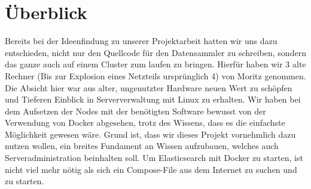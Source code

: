 \documentclass[12pt,oneside,a4paper,parskip]{scrbook}
\begin{document}
\section{Überblick} Bereits bei der Ideenfindung zu unserer Projektarbeit hatten wir uns dazu entschieden, nicht nur den Quellcode für den Datensammler zu schreiben, sondern das ganze auch auf einem Cluster zum laufen zu bringen. Hierfür haben wir 3 alte Rechner (Bis zur Explosion eines Netzteils ursprünglich 4) von Moritz genommen. Die Absicht hier war aus alter, ungenutzter Hardware neuen Wert zu schöpfen und Tieferen Einblick in Serververwaltung mit Linux zu erhalten. Wir haben bei dem Aufsetzen der Nodes mit der benötigten Software bewusst von der Verwendung von Docker abgesehen, trotz des Wissens, dass es die einfachste Möglichkeit gewesen wäre. Grund ist, dass wir dieses Projekt vornehmlich dazu nutzen wollen, ein breites Fundament an Wissen aufzubauen, welches auch Serveradministration beinhalten soll. Um Elasticsearch mit Docker zu starten, ist nicht viel mehr nötig als sich ein Compose-File aus dem Internet zu suchen und zu starten.
\end{document}
